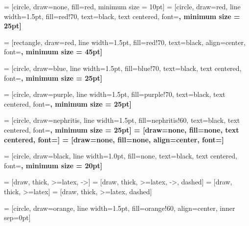 
 = [circle, draw=none, fill=red, minimum size = 10pt]
 = [circle, draw=red, line width=1.5pt, fill=red!70, text=black, text centered, font=\bf \normalsize, minimum size = 25pt]

 = [rectangle, draw=red, line width=1.5pt, fill=red!70, text=black, align=center, font=\bf \normalsize, minimum size = 45pt]

 = [circle, draw=blue, line width=1.5pt, fill=blue!70, text=black, text centered, font=\bf \normalsize, minimum size = 25pt]

 = [circle, draw=purple, line width=1.5pt, fill=purple!70, text=black, text centered, font=\bf \normalsize, minimum size = 25pt]


 = [circle, draw=nephritis, line width=1.5pt, fill=nephritis!60, text=black, text centered, font=\bf \normalsize, minimum size = 25pt]
 = [draw=none, fill=none, text centered, font=\bf \normalsize]
 = [draw=none, fill=none, align=center, font=\bf \normalsize]

 = [circle, draw=black, line width=1.0pt, fill=none, text=black, text centered, font=\bf \normalsize, minimum size = 20pt]


  = [draw, thick, >=latex, ->]
  = [draw, thick, >=latex, ->, dashed]
  = [draw, thick, >=latex]
  = [draw, thick, >=latex, dashed]


 = [circle, draw=orange, line width=1.5pt, fill=orange!60, align=center, inner sep=0pt]